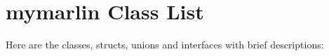 \section{mymarlin Class List}
Here are the classes, structs, unions and interfaces with brief descriptions:\begin{CompactList}
\item{}
\end{CompactList}
